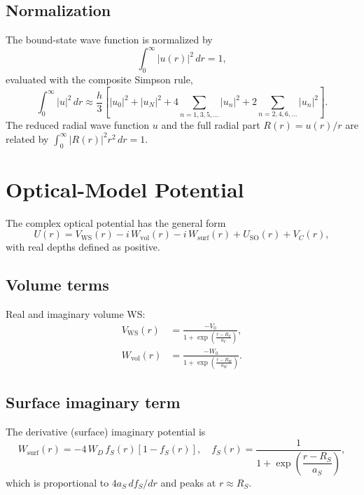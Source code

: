 \documentclass[12pt,a4paper]{article}
\begin{document}
\subsection{Normalization}

The bound-state wave function is normalized by
\begin{equation}
  \int_0^\infty |u(r)|^2\,dr = 1,
\end{equation}
evaluated with the composite Simpson rule,
\begin{equation}
  \int_0^\infty |u|^2\,dr \approx
  \frac{h}{3}\!\left[
    |u_0|^2 + |u_N|^2
    + 4\sum_{n=1,3,5,\ldots}|u_n|^2
    + 2\sum_{n=2,4,6,\ldots}|u_n|^2
  \right].
\end{equation}
The reduced radial wave function $u$ and the full radial part
$R(r) = u(r)/r$ are related by
$\int_0^\infty |R(r)|^2 r^2\,dr = 1$.

\section{Optical-Model Potential}

The complex optical potential has the general form
\begin{equation}
  U(r) = V_\mathrm{WS}(r)
       - i\,W_\mathrm{vol}(r)
       - i\,W_\mathrm{surf}(r)
       + U_\mathrm{SO}(r)
       + V_C(r),
  \label{eq:optical-potential}
\end{equation}
with real depths defined as positive.

\subsection{Volume terms}

Real and imaginary volume WS:
\begin{align}
  V_\mathrm{WS}(r) &= \frac{-V_0}{1+\exp\!\left(\frac{r-R_V}{a_V}\right)},\\[4pt]
  W_\mathrm{vol}(r) &= \frac{-W_0}{1+\exp\!\left(\frac{r-R_W}{a_W}\right)}.
\end{align}

\subsection{Surface imaginary term}

The derivative (surface) imaginary potential is
\begin{equation}
  W_\mathrm{surf}(r) =
  -4\,W_D\,f_S(r)\!\left[1-f_S(r)\right],
  \quad
  f_S(r) = \frac{1}{1+\exp\!\left(\dfrac{r-R_S}{a_S}\right)},
  \label{eq:surface-ws}
\end{equation}
which is proportional to $4a_S\,df_S/dr$ and peaks at $r\approx R_S$.
\end{document}
